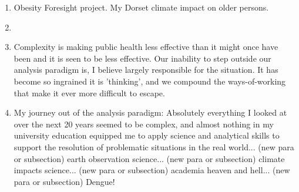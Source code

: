 \begin{enumerate}
	\item {} Obesity Foresight project. My Dorset climate impact on older persons.
	\item {}
	\item {} Complexity is making public health less effective than it might once have been and it is seen to be less effective. Our inability to step outside our analysis paradigm is, I believe largely responsible for the situation. It has become so ingrained it is 'thinking', and we compound the ways-of-working that make it ever more difficult to escape. 
	\item {} My journey out of the analysis paradigm: Absolutely everything I looked at over the next 20 years seemed to be complex, and almost nothing in my university education equipped me to apply science and analytical skills to support the resolution of problematic situations in the real world... (new para or subsection) earth observation science... (new para or subsection) climate impacts science... (new para or subsection) academia heaven and hell... (new para or subsection) Dengue!
\end{enumerate}

